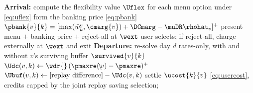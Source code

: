 \begin{algorithm}[t]
\caption{$\pineg$: negotiation at arrival, settlement at departure}
\label{alg:neg}
\DontPrintSemicolon
{}
\textbf{Arrival:}\;
compute the flexibility value $\Uflex$ for each menu option under
\eqref{eq:uflex}\;
form the banking price \eqref{eq:pbank}\;
\quad $\pbank{v}{k} = [\max(\bar{w}^e_k, \cmarg{v}) + \DCmarg - \muDR\rhohat_v]^+$\;
present menu $+$ banking price $+$ reject-all at $\wext$\;
user selects; if reject-all, charge externally at $\wext$ and exit\;
\textbf{Departure:}\;
re-solve day $d$ rates-only, with and without $v$'s surviving buffer
$\survived{v}{k}$\;
$\Udc(v,k) \leftarrow \wdr{}\,(\pmaxre(\!\setminus\!v) - \pmaxre)^+$\;
\quad{}\;
$\Ubuf(v,k) \leftarrow [\text{replay difference}] - \Udc(v,k)$\;
\quad{}\;
settle $\ucost{k}{v}$ \eqref{eq:usercost}, credits capped by the joint
replay saving\;
\Return selection;
\end{algorithm}